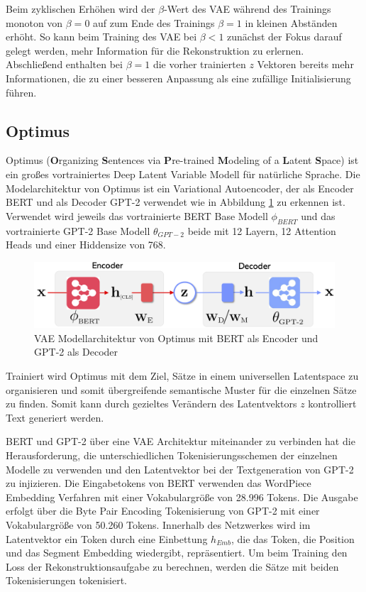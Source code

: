 Beim zyklischen Erhöhen wird der $\beta$-Wert des VAE während des Trainings monoton von $\beta=0$ auf zum Ende des Trainings $\beta=1$ in kleinen Abständen erhöht.
So kann beim Training des VAE bei $\beta<1$ zunächst der Fokus darauf gelegt werden, mehr Information für die Rekonstruktion zu erlernen. 
Abschließend enthalten bei $\beta=1$ die vorher trainierten $z$ Vektoren bereits mehr Informationen, die zu einer besseren Anpassung als eine zufällige Initialisierung führen.


\subsection{Optimus}
Optimus (\textbf{O}rganizing \textbf{S}entences via \textbf{P}re-trained \textbf{M}odeling of a \textbf{L}atent \textbf{S}pace) \citep{DBLP:journals/corr/abs-2004-04092} ist ein großes vortrainiertes Deep Latent Variable Modell für natürliche Sprache.
Die Modelarchitektur von Optimus ist ein Variational Autoencoder, der als Encoder BERT und als Decoder GPT-2 verwendet wie in Abbildung \ref{optimus_scheme_fig} zu erkennen ist. 
Verwendet wird jeweils das vortrainierte BERT Base Modell $\phi_{BERT}$ und das vortrainierte GPT-2 Base Modell $\theta_{GPT-2}$ beide mit 12 Layern, 12 Attention Heads und einer Hiddensize von 768. 
\begin{figure}[h]
    \centering
    \includegraphics[width=\textwidth]{bilder/optimus_scheme}
    \caption{VAE Modellarchitektur von Optimus mit BERT als Encoder und GPT-2 als Decoder \citep{DBLP:journals/corr/abs-2004-04092}}
    \label{optimus_scheme_fig}
\end{figure}
Trainiert wird Optimus mit dem Ziel, Sätze in einem universellen Latentspace zu organisieren und somit übergreifende semantische Muster für die einzelnen Sätze zu finden.
Somit kann durch gezieltes Verändern des Latentvektors $z$ kontrolliert Text generiert werden. %

BERT und GPT-2 über eine VAE Architektur miteinander zu verbinden hat die Herausforderung, die unterschiedlichen Tokenisierungsschemen der einzelnen Modelle zu verwenden und den Latentvektor bei der Textgeneration von GPT-2 zu injizieren. 
Die Eingabetokens von BERT verwenden das WordPiece Embedding Verfahren \citep{wordpiece} mit einer Vokabulargröße von 28.996 Tokens. 
Die Ausgabe erfolgt über die Byte Pair Encoding Tokenisierung \citep{bytepairencoding} von GPT-2 mit einer Vokabulargröße von 50.260 Tokens. 
Innerhalb des Netzwerkes wird im Latentvektor ein Token durch eine Einbettung $h_{Emb}$, die das Token, die Position und das Segment Embedding wiedergibt, repräsentiert.
Um beim Training den Loss der Rekonstruktionsaufgabe zu berechnen, werden die Sätze mit beiden Tokenisierungen tokenisiert.


